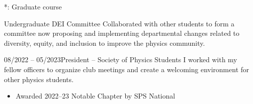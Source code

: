 \documentclass{cv}
\begin{document}
\vspace{-0.6em}
*: Graduate course
\vspace{0.6em}


\begin{extracurricular}{}{Undergraduate DEI Committee}
    Collaborated with other students to form a committee now proposing and
    implementing departmental changes related to diversity, equity, and
    inclusion to improve the physics community.
\end{extracurricular}

\begin{extracurricular}{08/2022 -- 05/2023}{President -- Society of Physics Students}
    I worked with my fellow officers to organize club meetings and create a
    welcoming environment for other physics students.
    \vspace{-0.03in}
    \begin{itemize}[leftmargin=15pt]
        \item Awarded 2022--23 Notable Chapter by SPS National
    \end{itemize}
\end{extracurricular}
\end{document}
